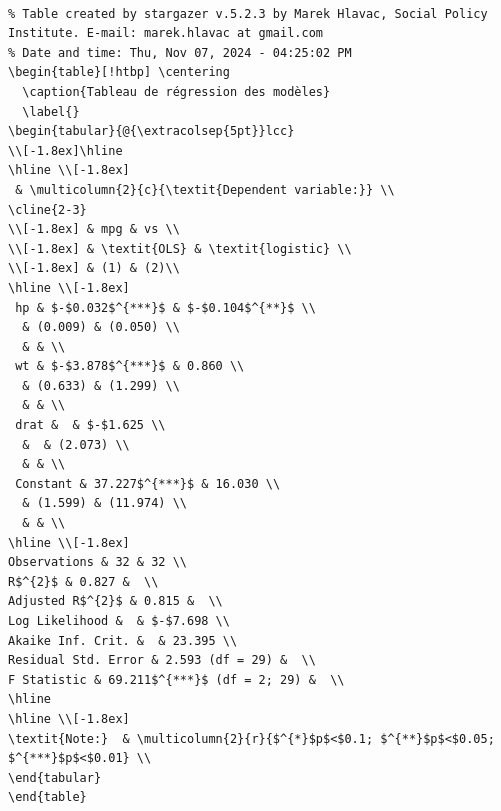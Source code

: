 \documentclass[
  letterpaper,
  DIV=11,
  numbers=noendperiod]{scrreprt}
\begin{document}
\begin{verbatim}

% Table created by stargazer v.5.2.3 by Marek Hlavac, Social Policy Institute. E-mail: marek.hlavac at gmail.com
% Date and time: Thu, Nov 07, 2024 - 04:25:02 PM
\begin{table}[!htbp] \centering 
  \caption{Tableau de régression des modèles} 
  \label{} 
\begin{tabular}{@{\extracolsep{5pt}}lcc} 
\\[-1.8ex]\hline 
\hline \\[-1.8ex] 
 & \multicolumn{2}{c}{\textit{Dependent variable:}} \\ 
\cline{2-3} 
\\[-1.8ex] & mpg & vs \\ 
\\[-1.8ex] & \textit{OLS} & \textit{logistic} \\ 
\\[-1.8ex] & (1) & (2)\\ 
\hline \\[-1.8ex] 
 hp & $-$0.032$^{***}$ & $-$0.104$^{**}$ \\ 
  & (0.009) & (0.050) \\ 
  & & \\ 
 wt & $-$3.878$^{***}$ & 0.860 \\ 
  & (0.633) & (1.299) \\ 
  & & \\ 
 drat &  & $-$1.625 \\ 
  &  & (2.073) \\ 
  & & \\ 
 Constant & 37.227$^{***}$ & 16.030 \\ 
  & (1.599) & (11.974) \\ 
  & & \\ 
\hline \\[-1.8ex] 
Observations & 32 & 32 \\ 
R$^{2}$ & 0.827 &  \\ 
Adjusted R$^{2}$ & 0.815 &  \\ 
Log Likelihood &  & $-$7.698 \\ 
Akaike Inf. Crit. &  & 23.395 \\ 
Residual Std. Error & 2.593 (df = 29) &  \\ 
F Statistic & 69.211$^{***}$ (df = 2; 29) &  \\ 
\hline 
\hline \\[-1.8ex] 
\textit{Note:}  & \multicolumn{2}{r}{$^{*}$p$<$0.1; $^{**}$p$<$0.05; $^{***}$p$<$0.01} \\ 
\end{tabular} 
\end{table} 
\end{verbatim}
\end{document}
